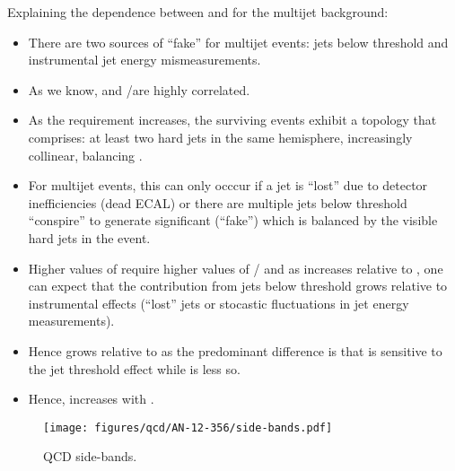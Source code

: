 Explaining the dependence between \alphat and \mhtmet for the multijet
background: 
\begin{itemize}
\item There are two sources of ``fake'' \met for multijet events: jets
  below threshold and instrumental jet energy mismeasurements.
  \item As we know, \alphat and \mht/\scalht are highly correlated.
  \item As the \alphat requirement increases, the surviving events
    exhibit a topology that comprises: at least two hard jets in the
    same hemisphere, increasingly collinear, balancing \met.
  \item For multijet events, this can only occcur if a jet is ``lost''
    due to detector inefficiencies (\eg dead ECAL) or there are
    multiple jets below threshold ``conspire'' to generate significant
    (``fake'') \mht which is balanced by the visible hard jets in the
    event.
  \item Higher values of \alphat require higher values of \mht/\scalht
    and as \mht increases relative to \scalht, one can expect that
    the contribution from jets below threshold grows relative to
    instrumental effects (\eg ``lost'' jets or stocastic fluctuations
    in jet energy measurements). 
  \item Hence \mht grows relative to \met as the predominant
    difference is that \mht is sensitive to the jet \pt threshold
    effect while \met is less so.
  \item Hence, \mhtmet increases with \alphat.
\end{itemize}

\begin{figure}[!h]
  \begin{center}
    \texttt{[image: figures/qcd/AN-12-356/side-bands.pdf]}
    \caption{QCD side-bands.}
    \label{fig:side-bands}
  \end{center}
\end{figure}


